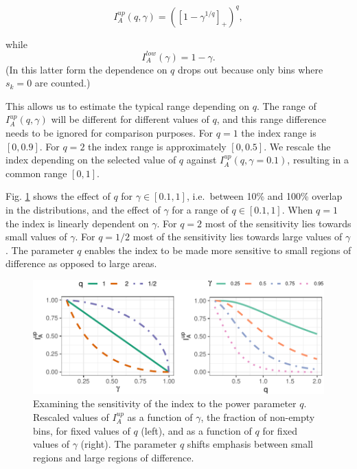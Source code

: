 \documentclass[]{interact}
\theoremstyle{plain}%
\theoremstyle{definition}
\theoremstyle{remark}
\begin{document}
\begin{equation}
I_A^{up}(q, \gamma) = ([1-\gamma^{1/q}]_+)^q,
\label{eq:p1}
\end{equation}

\noindent while \begin{equation}
I_A^{low}(\gamma) = 1-\gamma.
\end{equation} (In this latter form the dependence on \(q\) drops out
because only bins where \(s_k=0\) are counted.)

This allows us to estimate the typical range depending on \(q\). The
range of \(I_A^{up}(q, \gamma)\) will be different for different values
of \(q\), and this range difference needs to be ignored for comparison
purposes. For \(q=1\) the index range is \([0,0.9]\). For \(q=2\) the
index range is approximately \([0, 0.5]\). We rescale the index
depending on the selected value of \(q\) against
\(I_A^{up}(q, \gamma=0.1)\), resulting in a common range \([0,1]\).

Fig. \ref{fig:behavior} shows the effect of \(q\) for
\(\gamma \in [0.1, 1]\), i.e.~between 10\% and 100\% overlap in the
distributions, and the effect of \(\gamma\) for a range of
\(q \in [0.1, 1]\). When \(q=1\) the index is linearly dependent on
\(\gamma\). For \(q=2\) most of the sensitivity lies towards small
values of \(\gamma\). For \(q=1/2\) most of the sensitivity lies towards
large values of \(\gamma\). The parameter \(q\) enables the index to be
made more sensitive to small regions of difference as opposed to large
areas.

\begin{figure}

{\centering \includegraphics[width=1\linewidth]{section_pursuit_files/figure-latex/behavior-1} 

}

\caption{Examining the sensitivity of the index to the power parameter $q$. Rescaled values of $I_A^{up}$ as a function of $\gamma$, the fraction of non-empty bins, for fixed values of $q$ (left), and as a function of $q$ for fixed values of $\gamma$ (right). The parameter $q$ shifts emphasis between small regions and large regions of difference.}\label{fig:behavior}
\end{figure}
\end{document}

